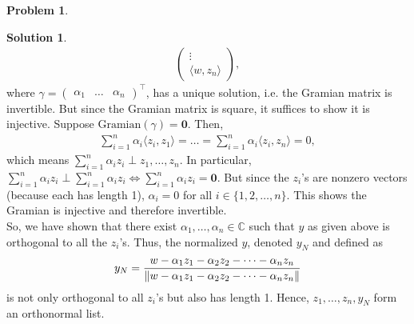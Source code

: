\documentclass{article}
\theoremstyle{definition}
\newtheorem*{prob*}{Problem}
\newtheorem*{sln*}{Solution}
\newcommand{\la}{\langle}
\newcommand{\ra}{\rangle}
\begin{document}
\begin{prob*}
\begin{enumerate}
\begin{sln*}
\begin{align*}
\begin{pmatrix}
			\vdots\\
			\la w,z_n \ra
			\end{pmatrix},
			\end{align*}
			where $\gamma = \begin{pmatrix}
			\alpha_1&\dots&\alpha_n
			\end{pmatrix}^\top$, has a unique solution, i.e. the Gramian matrix is invertible. But since the Gramian matrix is square, it suffices to show it is injective. Suppose $\text{Gramian}(\gamma) = \mathbf{0}$. Then,
			\begin{align*}
			\sum^n_{i=1}\alpha_i \la z_i,z_1 \ra = \dots = \sum^n_{i=1}\alpha_i \la z_i,z_n \ra = 0,
			\end{align*}
			which means $\sum^n_{i=1}\alpha_i z_i \perp z_1,\dots, z_n$. In particular, $\sum^n_{i=1}\alpha_i z_i \perp \sum^n_{i=1}\alpha_i z_i \iff \sum^n_{i=1}\alpha_i z_i = \mathbf{0}$. But since the $z_i$'s are nonzero vectors (because each has length 1), $\alpha_i = 0$ for all $i \in  \{1,2,\dots,n \}$. This shows the Gramian is injective and therefore invertible. \\
			
			So, we have shown that there exist $\alpha_1,\dots,\alpha_n \in \mathbb{C}$ such that $y$ as given above is orthogonal to all the $z_i$'s. Thus, the normalized $y$, denoted $y_N$ and defined as
			\begin{align*}
			y_N = \frac{w - \alpha_1 z_1 - \alpha_2 z_2 - \dots - \alpha_n z_n}{\norm{w - \alpha_1 z_1 - \alpha_2 z_2 - \dots - \alpha_n z_n}}
			\end{align*}
			is not only orthogonal to all $z_i$'s but also has length 1. Hence, $z_1,\dots,z_n,y_N$ form an orthonormal list. \\
			

\end{sln*}
\end{enumerate}
\end{prob*}
\end{document}
